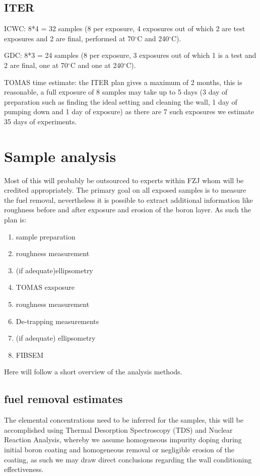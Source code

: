 \documentclass{article}
\begin{document}
\subsection{ITER}
ICWC: 8*4 = 32 samples (8 per exposure, 4 exposures out of which 2 are test exposures and 2 are final, 
performed at 70$^\circ$C and 240$^\circ$C).

GDC: 8*3 = 24 samples (8 per exposure, 3 exposures out of which 1 is a test and 2 are final,
one at 70$^\circ$C and one at 240$^\circ$C).

TOMAS time estimate: the ITER plan gives a maximum of 2 months, this is reasonable,
a full exposure of 8 samples may take up to 5 days (3 day of preparation such as finding the 
ideal setting and cleaning the wall, 1 day of pumping down and 1 day of exposure)
as there are 7 such exposures we estimate 35 days of experiments.
\section{Sample analysis}
Most of this will probably be outsourced to experts within FZJ whom will
be credited appropriately. The primary goal on all exposed samples
is to measure the fuel removal, nevertheless it is possible to extract additional
information like roughness before and after exposure and erosion of the boron layer.
As such the plan is: 
\begin{enumerate}
    \item sample preparation
    \item roughness measurement
    \item (if adequate)ellipsometry
    \item TOMAS exsposure
    \item roughness measurement
    \item De-trapping measurements
    \item (if adequate) ellipsometry 
    \item FIBSEM
\end{enumerate}
Here will follow a short overview of the analysis methods.
\subsection{fuel removal estimates}
The elemental concentrations need to be inferred for the samples, this will be accomplished
using Thermal Desorption Spectroscopy (TDS) and Nuclear Reaction Analysis, whereby we 
assume homogeneous impurity doping during initial boron coating
and homogeneous removal or negligible erosion of the coating, as such 
we may draw direct conclusions regarding the wall conditioning effectiveness.
\end{document}
